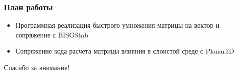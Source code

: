 \documentclass[10pt]{beamer}
\begin{document}
\begin{frame}
	\frametitle{План работы}
	\begin{itemize}
		\item
		Программная реализация быстрого умножения матрицы на вектор и сопряжение с BISGStab

		\item
		Сопряжение кода расчета матрицы влияния в слоистой среде с Planar3D
	\end{itemize}
	\bigskip
	\begin{center}
		\huge
		Спасибо за внимание!
	\end{center}
\end{frame}
\end{document}
